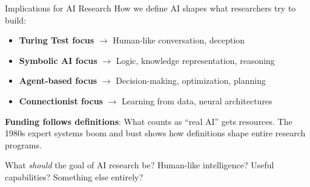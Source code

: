 ﻿\documentclass[aspectratio=169,11pt]{beamer}
\begin{document}
\begin{frame}{Implications for AI Research}
How we define AI shapes what researchers try to build:

\vspace{0.2em}
\begin{itemize}
    \item \textbf{Turing Test focus} $\rightarrow$ Human-like conversation, deception
    \item \textbf{Symbolic AI focus} $\rightarrow$ Logic, knowledge representation, reasoning
    \item \textbf{Agent-based focus} $\rightarrow$ Decision-making, optimization, planning
    \item \textbf{Connectionist focus} $\rightarrow$ Learning from data, neural architectures
\end{itemize}

\vspace{0.3em}
\textbf{Funding follows definitions}: What counts as ``real AI'' gets resources. The 1980s expert systems boom and bust shows how definitions shape entire research programs.

\vspace{0.3em}
\begin{discussionbox}[Discussion]
What \emph{should} the goal of AI research be? Human-like intelligence? Useful capabilities? Something else entirely?
\end{discussionbox}
\end{frame}
\end{document}
